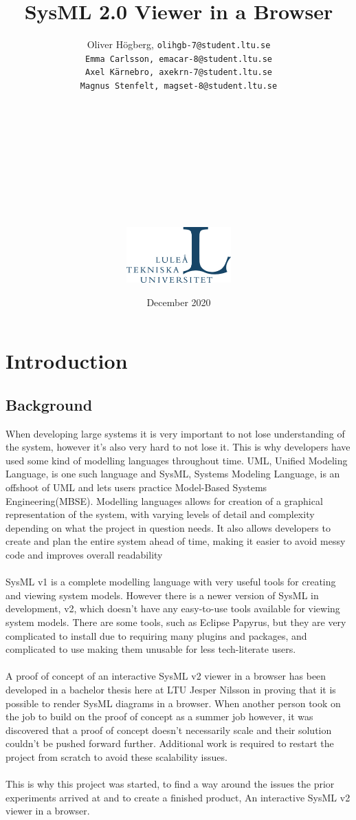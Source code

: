 \documentclass{article}
\title{SysML 2.0 Viewer in a Browser}
\author{Oliver Högberg, \tt olihgb-7@student.ltu.se \\ 
Emma Carlsson, \tt emacar-8@student.ltu.se \\ 
Axel Kärnebro, \tt axekrn-7@student.ltu.se \\ 
Magnus Stenfelt, \tt magset-8@student.ltu.se \\
\\
\\
\\
\\
\\
\\
\\
\\
\\
\\
\includegraphics[width=0.3\textwidth]{ltu_swe.jpg}}
\date{December 2020}
\begin{document}
\maketitle
\newpage
\tableofcontents
\newpage

\section{Introduction}

\subsection{Background}
When developing large systems it is very important to not lose understanding of the system, however it's also very hard to not lose it. This is why developers have used some kind of modelling languages throughout time. UML, Unified Modeling Language, is one such language and SysML, Systems Modeling Language, is an offshoot of UML and lets users practice Model-Based Systems Engineering(MBSE).  Modelling languages allows for creation of a graphical representation of the system, with varying levels of detail and complexity depending on what the project in question needs. It also allows developers to create and plan the entire system ahead of time, making it easier to avoid messy code and improves overall readability 
\\ \\
SysML v1 is a complete modelling language with very useful tools for creating and viewing system models. However there is a newer version of SysML in development, v2, which doesn't have any easy-to-use tools available for viewing system models. There are some tools, such as Eclipse Papyrus, but they are very complicated to install due to requiring many plugins and packages, and complicated to use making them unusable for less tech-literate users.
\\ \\
A proof of concept of an interactive SysML v2 viewer in a browser has been developed in a bachelor thesis here at LTU Jesper Nilsson in \cite{Jesper2020} proving that it is possible to render SysML diagrams in a browser. When another person took on the job \cite{Tommy2020} to build on the proof of concept as a summer job however, it was discovered that a proof of concept doesn't necessarily scale and their solution couldn't be pushed forward further. Additional work is required to restart the project from scratch to avoid these scalability issues. 
\\ \\
This is why this project was started, to find a way around the issues the prior experiments arrived at and to create a finished product, An interactive SysML v2 viewer in a browser.
\end{document}
